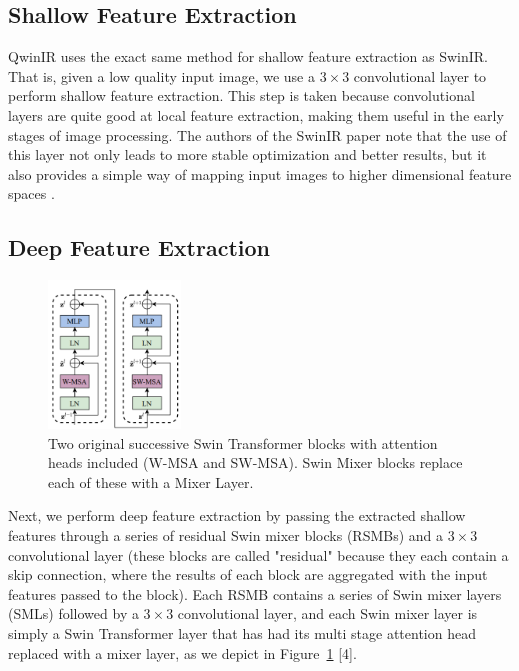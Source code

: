 \documentclass{article}
\begin{document}
\subsection{Shallow Feature Extraction}

QwinIR uses the exact same method for shallow feature extraction as SwinIR. That is, given a low quality input image, we use a $3 \times 3$ convolutional layer to perform shallow feature extraction. This step is taken because convolutional layers are quite good at local feature extraction, making them useful in the early stages of image processing. The authors of the SwinIR paper note that the use of this layer not only leads to more stable optimization and better results, but it also provides a simple way of mapping input images to higher dimensional feature spaces \citep{liang2021swinir}.

\subsection{Deep Feature Extraction}

\begin{figure}\label{fig:transformer}
    \centering
    \includegraphics[width=100pt]{swin-transformer-block.png}
    \caption{Two original successive Swin Transformer blocks with attention heads included (W-MSA and SW-MSA). Swin Mixer blocks replace each of these with a Mixer Layer.}
\end{figure}

Next, we perform deep feature extraction by passing the extracted shallow features through a series of residual Swin mixer blocks (RSMBs) and a $3 \times 3$ convolutional layer (these blocks are called "residual" because they each contain a skip connection, where the results of each block are aggregated with the input features passed to the block). Each RSMB contains a series of Swin mixer layers (SMLs) followed by a $3 \times 3$ convolutional layer, and each Swin mixer layer is simply a Swin Transformer layer that has had its multi stage attention head replaced with a mixer layer, as we depict in Figure~\ref{fig:transformer} [4].
\end{document}

